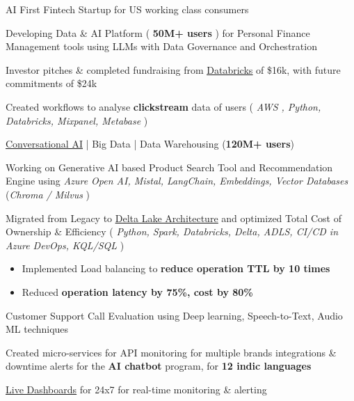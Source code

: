 \documentclass[]{deedy-resume-reversed}
\begin{document}
\vspace{\topsep} %

\begin{tightemize}
\item AI First Fintech Startup for US working class consumers
\item Developing Data \& AI Platform ( \textbf{50M+ users} ) for Personal Finance Management tools using LLMs with Data Governance and Orchestration
\item Investor pitches \& completed fundraising from \underline{\href{https://www.databricks.com/product/startups}{Databricks}} of \$16k, with future commitments of \$24k
\item Created workflows to analyse \textbf{clickstream} data of users (\textit{ AWS , Python,  Databricks, Mixpanel, Metabase })
\end{tightemize}
\sectionsep

\vspace{\topsep} %

\begin{tightemize}
\item \href{https://drive.google.com/file/d/1pztxC-TmhhKaqk0sQUJ8XaVXDKmad92V/view?usp=sharing}{\underline{Conversational AI}} | Big Data | Data Warehousing (\textbf{120M+ users})
\item Working on Generative AI based Product Search Tool and Recommendation Engine using \textit{Azure Open AI, Mistal, LangChain, Embeddings, Vector Databases} (\textit{Chroma / Milvus} )
\item Migrated from Legacy to \href{https://drive.google.com/file/d/1FH0p2Gy_5d0h4D7Czsslx3dkdUqMD-IP/view?usp=sharing}{\underline{Delta Lake Architecture}} and optimized Total Cost of Ownership \& Efficiency (\textit{ Python, Spark, Databricks, Delta, ADLS, CI/CD in Azure DevOps, KQL/SQL })
\begin{itemize}
        \item Implemented Load balancing to\textbf{ reduce operation TTL by 10 times}
        \item Reduced \textbf{operation latency by 75\%, cost by 80\%}
\end{itemize}

\item Customer Support Call Evaluation using Deep learning, Speech-to-Text, Audio ML techniques
\item Created micro-services for API monitoring for multiple brands integrations \& downtime alerts for the \textbf{AI chatbot} program, for \textbf{12 indic languages}
\item \href{https://drive.google.com/file/d/1ON88613DfbFg78HwDsAdzry1J6u3jsra/view?usp=drive_link}{\underline{Live Dashboards}} for 24x7 for real-time monitoring \& alerting
\end{tightemize}
\sectionsep
\end{document}
